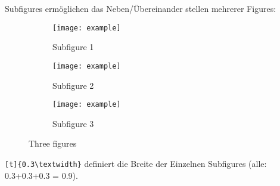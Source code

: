 \documentclass[twoside, 11pt, ngerman, a4paper, biblography=totoc]{scrartcl}
\begin{document}
Subfigures ermöglichen das Neben/Übereinander stellen mehrerer Figures:
%

\begin{figure}[h!]
     \centering
     \begin{subfigure}[b]{0.3\textwidth}
         \centering
         \texttt{[image: example]}
         \caption{Subfigure 1}
         \label{fig:subfig1}
     \end{subfigure}
     \hfill
     \begin{subfigure}[b]{0.3\textwidth}
         \centering
         \texttt{[image: example]}
         \caption{Subfigure 2}
         \label{fig:subfig2}
     \end{subfigure}
     \hfill
     \begin{subfigure}[b]{0.3\textwidth}
         \centering
         \texttt{[image: example]}
         \caption{Subfigure 3}
         \label{fig:subfig3}
     \end{subfigure}
        \caption{Three figures}
        \label{fig:three graphs}
\end{figure}

\texttt{[t]\{0.3\textbackslash textwidth\}} definiert die Breite der Einzelnen Subfigures (alle: 0.3+0.3+0.3 = 0.9).
\end{document}
